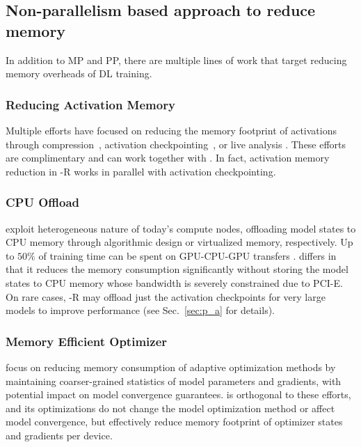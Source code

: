 \subsection{Non-parallelism based approach to reduce memory}
In addition to MP and PP, there are multiple lines of work that target reducing memory overheads of DL training. 
\subsubsection{Reducing Activation Memory}
Multiple efforts have focused on reducing the memory footprint of activations through compression~\cite{jain2018gist}, activation checkpointing~\cite{DBLP:journals/corr/ChenXZG16, Jain2019CheckmateBT}, or live analysis \cite{DBLP:journals/corr/abs-1801-04380}. These efforts are complimentary and can work together with \name. In fact, activation memory reduction in \name-R works in parallel with activation checkpointing. 
\subsubsection{CPU Offload}
\cite{layer2layer, 7783721} exploit heterogeneous nature of today's compute nodes, offloading model states to CPU memory through algorithmic design or virtualized memory, respectively. Up to $50\%$ of training time can be spent on GPU-CPU-GPU transfers \cite{layer2layer}. \name differs in that it reduces the memory consumption significantly without storing the model states to CPU memory whose bandwidth is severely constrained due to PCI-E. On rare cases, \name-R may offload just the activation checkpoints for very large models to improve performance (see Sec.~\ref{sec:p_a} for details). 
\subsubsection{Memory Efficient Optimizer}
\cite{DBLP:journals/corr/adafactor,Anil2019MemoryEfficientAO} focus on reducing memory consumption of adaptive optimization methods by maintaining coarser-grained statistics of model parameters and gradients, with potential impact on model convergence guarantees. \name is orthogonal to these efforts, and its optimizations 
do not change the model optimization method or affect model convergence, but effectively reduce memory footprint of optimizer states and gradients per device.
